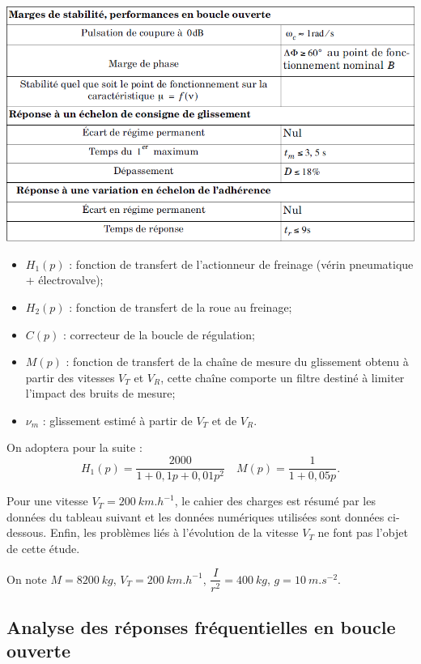 \documentclass[10pt,fleqn]{article} %
\begin{document}
\begin{multicols}{2}
\begin{center}
\includegraphics[width=\linewidth]{images/fig_02}
\end{center}

\begin{itemize}
\item $H_1(p)$ : fonction de transfert de l’actionneur de freinage (vérin pneumatique
+ électrovalve);
\item $H_2(p)$ : fonction de transfert de la roue au freinage;
\item $C(p)$ : correcteur de la boucle de régulation;
\item $M(p)$ : fonction de transfert de la chaîne de mesure du glissement obtenu à
partir des vitesses $V_T$ et $V_R$, cette chaîne comporte un filtre destiné à limiter
l’impact des bruits de mesure;
\item $\nu_m$ : glissement estimé à partir de $V_T$ et de $V_R$.
\end{itemize}

On adoptera pour la suite : 
$$
H_1(p)=\dfrac{2000}{1+0,1p+0,01p^2}
\quad
M(p)=\dfrac{1}{1+0,05 p}.
$$

Pour une vitesse $V_T=\SI{200}{km.h^{-1}}$, le cahier des charges est résumé par les données 
du tableau suivant et les données numériques utilisées sont données ci-dessous.
Enfin, les problèmes liés à l’évolution de la vitesse $V_T$ ne font pas l’objet de cette
étude.

On note $M=\SI{8200}{kg}$, $V_T=\SI{200}{km.h^{-1}}$, $\dfrac{I}{r^2}=\SI{400}{kg}$, $g=\SI{10}{m.s^{-2}}$.

\subsection*{Analyse des réponses fréquentielles en boucle ouverte}


\end{multicols}
\end{document}
